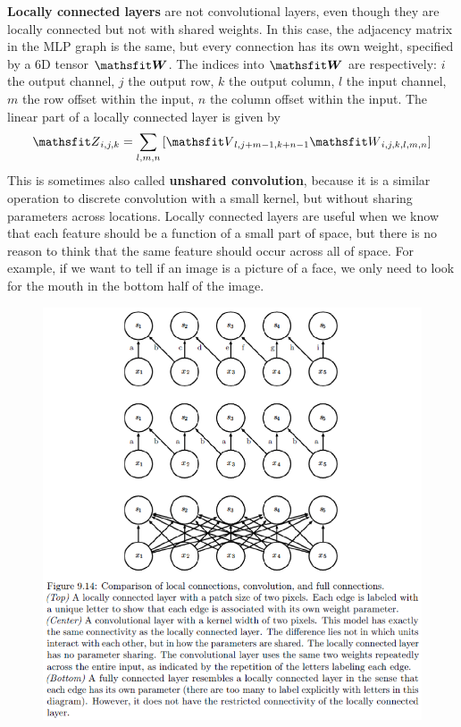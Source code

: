 \begin{multicols}{2}
	\textbf{Locally connected layers}  are not convolutional layers, even though they are locally connected but not with shared weights.
	In this case, the adjacency matrix in the MLP graph is the same, but every connection has its own weight, specified by a 6D tensor $\tW$.
	The indices into $\tW$ are respectively:
	$i$ the output channel, $j$ the output row, $k$ the output column, $l$ the input channel, $m$ the row offset within the input, $n$ the column offset within the input.
	The linear part of a locally connected layer is given by
	\[ \etZ_{i,j,k} = \sum_{l,m,n} \left[ \etV_{l,j+m-1,k+n-1} \etW_{i,j,k,l,m,n} \right] \]
	This is sometimes also called \textbf{unshared convolution}, because it is a similar operation to discrete convolution with a small kernel, but without sharing parameters across locations.
	Locally connected layers are useful when we know that each feature should be a function of a small part of space, but there is no reason to think that the same feature should occur across all of space.
	For example, if we want to tell if an image is a picture of a face, we only need to look for the mouth in the bottom half of the image.
	\begin{figure}[H]
		\centering
		\includegraphics[width=0.8\linewidth]{images/locallyConn.png}
	\end{figure}
	\newpage

\end{multicols}
